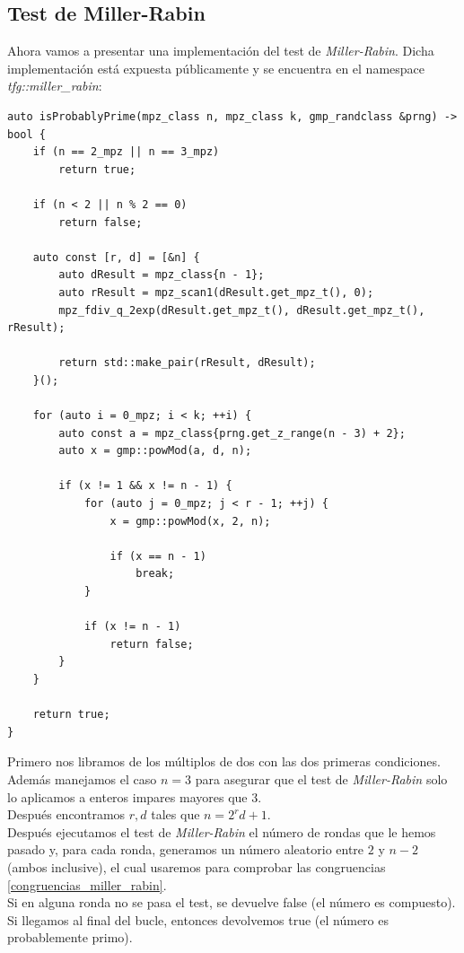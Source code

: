 \subsection{Test de Miller-Rabin}

Ahora vamos a presentar una implementación del test de \textit{Miller-Rabin}. Dicha implementación está expuesta públicamente y se encuentra en el namespace \textit{tfg::miller\_rabin}:\\

\begin{lstlisting}
auto isProbablyPrime(mpz_class n, mpz_class k, gmp_randclass &prng) -> bool {
	if (n == 2_mpz || n == 3_mpz)
		return true;
	
	if (n < 2 || n % 2 == 0)
		return false;
	
	auto const [r, d] = [&n] {
		auto dResult = mpz_class{n - 1};
		auto rResult = mpz_scan1(dResult.get_mpz_t(), 0);
		mpz_fdiv_q_2exp(dResult.get_mpz_t(), dResult.get_mpz_t(), rResult);
		
		return std::make_pair(rResult, dResult);
	}();
	
	for (auto i = 0_mpz; i < k; ++i) {
		auto const a = mpz_class{prng.get_z_range(n - 3) + 2};
		auto x = gmp::powMod(a, d, n);
		
		if (x != 1 && x != n - 1) {
			for (auto j = 0_mpz; j < r - 1; ++j) {
				x = gmp::powMod(x, 2, n);
				
				if (x == n - 1)
					break;
			}
			
			if (x != n - 1)
				return false;
		}
	}
	
	return true;
}
\end{lstlisting}

Primero nos libramos de los múltiplos de dos con las dos primeras condiciones. Además manejamos el caso $n = 3$ para asegurar que el test de \textit{Miller-Rabin} solo lo aplicamos a enteros impares mayores que $3$.\\

Después encontramos $r, d$ tales que $n = 2^rd + 1$.\\

Después ejecutamos el test de \textit{Miller-Rabin} el número de rondas que le hemos pasado y, para cada ronda, generamos un número aleatorio entre $2$ y $n-2$ (ambos inclusive), el cual usaremos para comprobar las congruencias \eqref{congruencias_miller_rabin}.\\

Si en alguna ronda no se pasa el test, se devuelve false (el número es compuesto). Si llegamos al final del bucle, entonces devolvemos true (el número es probablemente primo).

